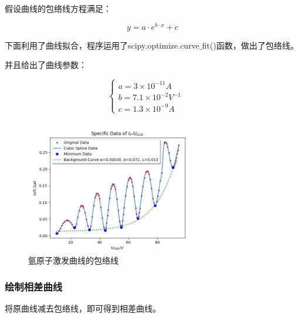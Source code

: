 \documentclass[a4paper,UTF8]{ctexart}
\begin{document}
假设曲线的包络线方程满足：

\begin{equation}
    y = a \cdot e^{b\cdot x} + c
\end{equation}

下面利用了曲线拟合，程序运用了scipy.optimize.curve$\_$fit()函数，做出了包络线。

并且给出了曲线参数：

\begin{equation}
    \left\{
        \begin{aligned}
            a=3\times 10^{-11}A & &\\
            b=7.1\times 10^{-2} V^{-1} & &\\
            c = 1.3\times 10^{-9}A & &
        \end{aligned}\right.
\end{equation}

\begin{figure}[H]
    \centering
    \begin{minipage}[b]{0.9\textwidth}
        \centering
        \includegraphics[width=0.7\textwidth]{./back.png}
        \caption{氩原子激发曲线的包络线}
    \end{minipage}
\end{figure}

\subsubsection{绘制相差曲线}

将原曲线减去包络线，即可得到相差曲线。
\end{document}
